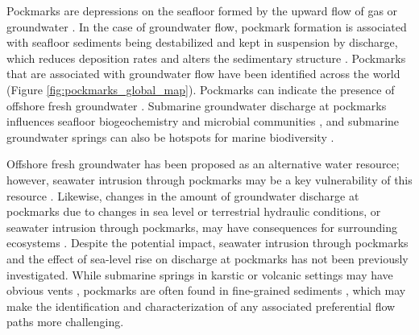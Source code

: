 \documentclass[pdflatex,sn-apa]{sn-jnl}%
\begin{document}
Pockmarks are depressions on the seafloor formed by the upward flow of gas or groundwater \citep{hovland_significance_2002}.
In the case of groundwater flow, pockmark formation is associated with seafloor sediments being destabilized and kept in suspension by discharge,
which reduces deposition rates and alters the sedimentary structure \citep{micallef_can_2023, zhang_review_2025}.
Pockmarks that are associated with groundwater flow have been identified across the world (Figure \ref{fig:pockmarks_global_map}).
Pockmarks can indicate the presence of offshore fresh groundwater \citep{micallef_offshore_2021, post_offshore_2013, bertoni_seismic_2020, hoffmann_complex_2020}.
Submarine groundwater discharge at pockmarks influences seafloor biogeochemistry and microbial communities \citep{purkamo_impact_2022},
and submarine groundwater springs can also be hotspots for marine biodiversity \citep{burnett_economic_2017, alorda-kleinglass_social_2021}.

Offshore fresh groundwater has been proposed as an alternative water resource; however, seawater intrusion through pockmarks may be a key vulnerability of this resource \citep{bakken_submarine_2012, zamrsky_offshore_2022, gyopari_wellington_2018}.
Likewise, changes in the amount of groundwater discharge at pockmarks due to changes in sea level or terrestrial hydraulic conditions,
or seawater intrusion through pockmarks, may have consequences for surrounding ecosystems \citep{purkamo_impact_2022}.
Despite the potential impact, seawater intrusion through pockmarks and the effect of sea-level rise on discharge at pockmarks has not been previously investigated.
While submarine springs in karstic or volcanic settings may have obvious vents \citep{fleury_submarine_2007, swarzenski_observations_2017},
pockmarks are often found in fine-grained sediments \citep{goff_modern_2019, matciak_pockmarks_2024, hoffmann_complex_2020},
which may make the identification and characterization of any associated preferential flow paths more challenging.
\end{document}
